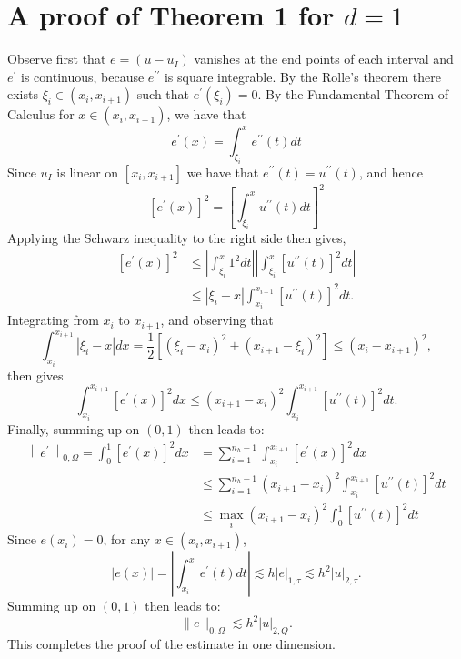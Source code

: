 \documentclass[10pt]{article}
\begin{document}
\section{A proof of Theorem 1 for $d=1$}
Observe first that $e=\left(u-u_{I}\right)$ vanishes at the end points of each interval and $e^{\prime}$ is continuous, because $e^{\prime \prime}$ is square integrable. By the Rolle's theorem there exists $\xi_{i} \in\left(x_{i}, x_{i+1}\right)$ such that $e^{\prime}\left(\xi_{i}\right)=0 .$ By the Fundamental Theorem of Calculus for $x \in\left(x_{i}, x_{i+1}\right)$, we have that
$$
e^{\prime}(x)=\int_{\xi_{i}}^{x} e^{\prime \prime}(t) d t
$$
Since $u_{I}$ is linear on $\left[x_{i}, x_{i+1}\right]$ we have that $e^{\prime \prime}(t)=u^{\prime \prime}(t)$, and hence
$$
\left[e^{\prime}(x)\right]^{2}=\left[\int_{\xi_{i}}^{x} u^{\prime \prime}(t) d t\right]^{2}
$$
Applying the Schwarz inequality to the right side then gives,
$$
\begin{aligned}
\left[e^{\prime}(x)\right]^{2} & \leq\left|\int_{\xi_{i}}^{x} 1^{2} d t\right|\left|\int_{\xi_{i}}^{x}\left[u^{\prime \prime}(t)\right]^{2} d t\right| \\
& \leq\left|\xi_{i}-x\right| \int_{x_{i}}^{x_{i+1}}\left[u^{\prime \prime}(t)\right]^{2} d t .
\end{aligned}
$$
Integrating from $x_{i}$ to $x_{i+1}$, and observing that
$$
\int_{x_{i}}^{x_{i+1}}\left|\xi_{i}-x\right| d x=\frac{1}{2}\left[\left(\xi_{i}-x_{i}\right)^{2}+\left(x_{i+1}-\xi_{i}\right)^{2}\right] \leq\left(x_{i}-x_{i+1}\right)^{2},
$$
then gives
$$
\int_{x_{i}}^{x_{i+1}}\left[e^{\prime}(x)\right]^{2} d x \leq\left(x_{i+1}-x_{i}\right)^{2} \int_{x_{i}}^{x_{i+1}}\left[u^{\prime \prime}(t)\right]^{2} d t .
$$
Finally, summing up on $(0,1)$ then leads to:
$$
\begin{aligned}
\left\|e^{\prime}\right\|_{0, \Omega}=\int_{0}^{1}\left[e^{\prime}(x)\right]^{2} d x &=\sum_{i=1}^{n_{h}-1} \int_{x_{i}}^{x_{i+1}}\left[e^{\prime}(x)\right]^{2} d x \\
& \leq \sum_{i=1}^{n_{h}-1}\left(x_{i+1}-x_{i}\right)^{2} \int_{x_{i}}^{x_{i+1}}\left[u^{\prime \prime}(t)\right]^{2} d t \\
& \leq \max _{i}\left(x_{i+1}-x_{i}\right)^{2} \int_{0}^{1}\left[u^{\prime \prime}(t)\right]^{2} d t
\end{aligned}
$$
Since $e\left(x_{i}\right)=0$, for any $x \in\left(x_{i}, x_{i+1}\right)$,
$$
|e(x)|=\left|\int_{x_{i}}^{x} e^{\prime}(t) d t\right| \lesssim h|e|_{1, \tau} \lesssim h^{2}|u|_{2, \tau} .
$$
Summing up on $(0,1)$ then leads to:
$$
\|e\|_{0, \Omega} \lesssim h^{2}|u|_{2, Q} .
$$
This completes the proof of the estimate in one dimension.
\end{document}
